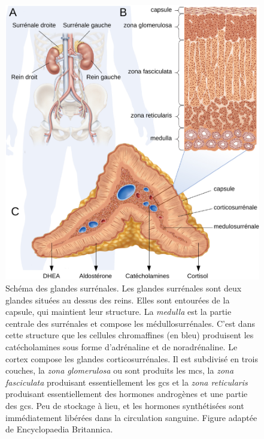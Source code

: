 \begin{figure}[!htbp]
\centering
\vspace{1\baselineskip}
\includegraphics[width=\textwidth]
{Figures/adrenal-gland/adrenal-gland.pdf}
\caption[Les glandes surrénales]
{
Schéma des glandes surrénales.
Les glandes surrénales sont deux glandes situées au dessus des reins.
Elles sont entourées de la capsule, qui maintient leur structure.
La \textit{medulla} est la partie centrale des surrénales et compose les médullosurrénales.
C'est dans cette structure que les cellules chromaffines (en bleu) produisent les catécholamines sous forme d'adrénaline et de noradrénaline.
Le cortex compose les glandes corticosurrénales.
Il est subdivisé en trois couches, la \textit{zona glomerulosa} ou sont produits les \glspl{mc}, la \textit{zona fasciculata} produisant essentiellement les \glspl{gc} et la \textit{zona reticularis} produisant essentiellement des hormones androgènes et une partie des \glspl{gc}.
Peu de stockage à lieu, et les hormones synthétisées sont immédiatement libérées dans la circulation sanguine.
Figure adaptée de Encyclopaedia Britannica.
}
\label{fig:adrenal-gland}
\end{figure}